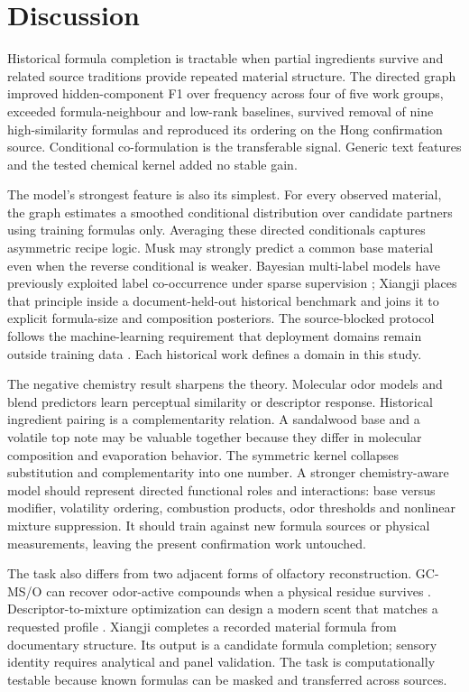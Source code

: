 \documentclass[12pt]{article}
\begin{document}
\section*{Discussion}

Historical formula completion is tractable when partial ingredients survive and related source traditions provide repeated material structure. The directed graph improved hidden-component F1 over frequency across four of five work groups, exceeded formula-neighbour and low-rank baselines, survived removal of nine high-similarity formulas and reproduced its ordering on the Hong confirmation source. Conditional co-formulation is the transferable signal. Generic text features and the tested chemical kernel added no stable gain.

The model's strongest feature is also its simplest. For every observed material, the graph estimates a smoothed conditional distribution over candidate partners using training formulas only. Averaging these directed conditionals captures asymmetric recipe logic. Musk may strongly predict a common base material even when the reverse conditional is weaker. Bayesian multi-label models have previously exploited label co-occurrence under sparse supervision \cite{ref13}; Xiangji places that principle inside a document-held-out historical benchmark and joins it to explicit formula-size and composition posteriors. The source-blocked protocol follows the machine-learning requirement that deployment domains remain outside training data \cite{ref14}. Each historical work defines a domain in this study.

The negative chemistry result sharpens the theory. Molecular odor models \cite{ref4,ref5,ref6,ref7,ref8} and blend predictors \cite{ref9} learn perceptual similarity or descriptor response. Historical ingredient pairing is a complementarity relation. A sandalwood base and a volatile top note may be valuable together because they differ in molecular composition and evaporation behavior. The symmetric kernel collapses substitution and complementarity into one number. A stronger chemistry-aware model should represent directed functional roles and interactions: base versus modifier, volatility ordering, combustion products, odor thresholds and nonlinear mixture suppression. It should train against new formula sources or physical measurements, leaving the present confirmation work untouched.

The task also differs from two adjacent forms of olfactory reconstruction. GC-MS/O can recover odor-active compounds when a physical residue survives \cite{ref3}. Descriptor-to-mixture optimization can design a modern scent that matches a requested profile \cite{ref10}. Xiangji completes a recorded material formula from documentary structure. Its output is a candidate formula completion; sensory identity requires analytical and panel validation. The task is computationally testable because known formulas can be masked and transferred across sources.
\end{document}
